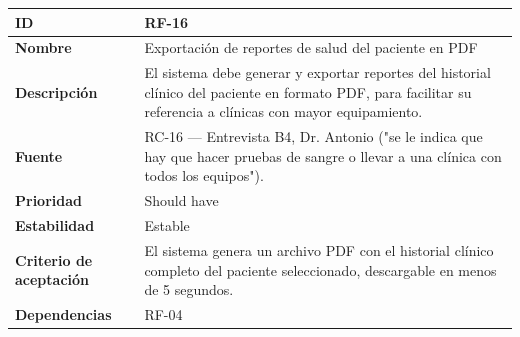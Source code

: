 {\def\LTcaptype{none} %
\begin{longtable}[]{@{}
  >{\raggedright\arraybackslash}p{}
  >{\raggedright\arraybackslash}p{}@{}}
\toprule\noalign{}
\begin{minipage}[b]{\linewidth}\raggedright
\textbf{ID}
\end{minipage} & \begin{minipage}[b]{\linewidth}\raggedright
RF-16
\end{minipage} \\
\midrule\noalign{}
\endhead
\bottomrule\noalign{}
\endlastfoot
\textbf{Nombre} & \begin{minipage}[t]{\linewidth}\raggedright
Exportación de reportes de salud del paciente en PDF
\end{minipage} \\
\textbf{Descripción} & \begin{minipage}[t]{\linewidth}\raggedright
El sistema debe generar y exportar reportes del historial clínico del
paciente en formato PDF, para facilitar su referencia a clínicas con
mayor equipamiento.
\end{minipage} \\
\textbf{Fuente} & \begin{minipage}[t]{\linewidth}\raggedright
RC-16 --- Entrevista B4, Dr. Antonio ("se le indica que hay que hacer
pruebas de sangre o llevar a una clínica con todos los equipos").
\end{minipage} \\
\textbf{Prioridad} & \begin{minipage}[t]{\linewidth}\raggedright
Should have
\end{minipage} \\
\textbf{Estabilidad} & \begin{minipage}[t]{\linewidth}\raggedright
Estable
\end{minipage} \\
\textbf{Criterio de aceptación} &
\begin{minipage}[t]{\linewidth}\raggedright
El sistema genera un archivo PDF con el historial clínico completo del
paciente seleccionado, descargable en menos de 5 segundos.
\end{minipage} \\
\textbf{Dependencias} & \begin{minipage}[t]{\linewidth}\raggedright
RF-04
\end{minipage} \\
\end{longtable}
}

